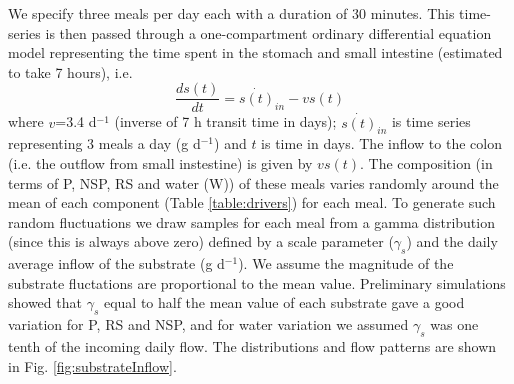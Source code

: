 \documentclass[a4paper]{article}
\begin{document}
We specify three meals per day each with a duration of 30 minutes. This time-series is then passed through a one-compartment ordinary differential equation model representing the time spent in the stomach and small intestine (estimated to take 7 hours), i.e.
\begin{equation}
    \frac{ds(t)}{dt}=\dot{s(t)}_{in}-vs(t)
\end{equation}
where $v$=3.4 d$^{-1}$ (inverse of 7 h transit time in days); $\dot{s(t)}_{in}$ is time series representing 3 meals a day (g d$^{-1}$) and $t$ is time in days. The inflow to the colon (i.e. the outflow from small instestine) is given by $vs(t)$. 
The composition (in terms of P, NSP, RS and water (W)) of these meals varies randomly around the mean of each component (Table \ref{table:drivers}) for each meal. 
To generate such random fluctuations we draw samples for each meal from a gamma distribution (since this is always above zero) defined by a scale parameter ($\gamma_s$) and the daily average inflow of the substrate (g d$^{-1}$). 
We assume the magnitude of the substrate fluctations are proportional to the mean value. 
Preliminary simulations showed that $\gamma_s$ equal to half the mean value of each substrate gave a good variation for P, RS and NSP, and for water variation we assumed $\gamma_s$ was one tenth of the incoming daily flow. 
The distributions and flow patterns are shown in Fig. \ref{fig:substrateInflow}.
\end{document}
